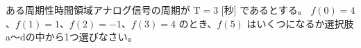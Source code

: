 ある周期性時間領域アナログ信号の周期が $\textrm{T} = 3$ [秒] であるとする。
$f(0) = 4$、$f(1) = 1$、$f(2) = -1$、$f(3) = 4$ のとき、$f(5)$ はいくつになるか選択肢a〜dの中から1つ選びなさい。
